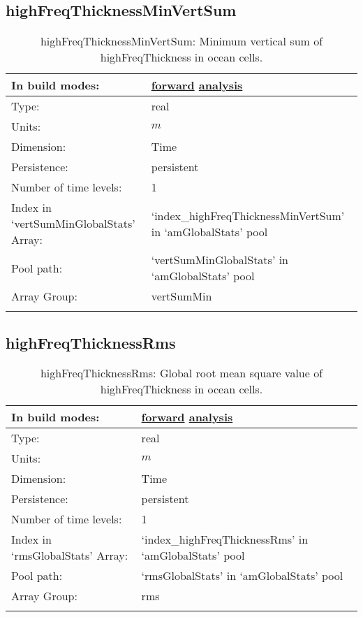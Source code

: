 \subsection[highFreqThicknessMinVertSum]{highFreqThicknessMinVertSum}
\label{subsec:var_sec_amGlobalStats_highFreqThicknessMinVertSum}
\begin{center}
\begin{longtable}{| p{2.0in} | p{4.0in} |}
        \hline 
        In build modes: & \hyperref[subsec:forward_var_tab_amGlobalStats]{forward} \hyperref[subsec:analysis_var_tab_amGlobalStats]{analysis} \\
        \hline 
        Type: & real \\
        \hline 
        Units: & $m$ \\
        \hline 
        Dimension: & Time \\
        \hline 
        Persistence: & persistent \\
        \hline 
        Number of time levels: & 1 \\
        \hline 
		 Index in `vertSumMinGlobalStats' Array: & `index\_highFreqThicknessMinVertSum' in `amGlobalStats' pool \\
		 \hline 
            Pool path: & `vertSumMinGlobalStats' in `amGlobalStats' pool \\
		 \hline 
		 Array Group: & vertSumMin \\
		 \hline 
    \caption{highFreqThicknessMinVertSum: Minimum vertical sum of highFreqThickness in ocean cells.}
\end{longtable}
\end{center}
\subsection[highFreqThicknessRms]{highFreqThicknessRms}
\label{subsec:var_sec_amGlobalStats_highFreqThicknessRms}
\begin{center}
\begin{longtable}{| p{2.0in} | p{4.0in} |}
        \hline 
        In build modes: & \hyperref[subsec:forward_var_tab_amGlobalStats]{forward} \hyperref[subsec:analysis_var_tab_amGlobalStats]{analysis} \\
        \hline 
        Type: & real \\
        \hline 
        Units: & $m$ \\
        \hline 
        Dimension: & Time \\
        \hline 
        Persistence: & persistent \\
        \hline 
        Number of time levels: & 1 \\
        \hline 
		 Index in `rmsGlobalStats' Array: & `index\_highFreqThicknessRms' in `amGlobalStats' pool \\
		 \hline 
            Pool path: & `rmsGlobalStats' in `amGlobalStats' pool \\
		 \hline 
		 Array Group: & rms \\
		 \hline 
    \caption{highFreqThicknessRms: Global root mean square value of highFreqThickness in ocean cells.}
\end{longtable}
\end{center}
